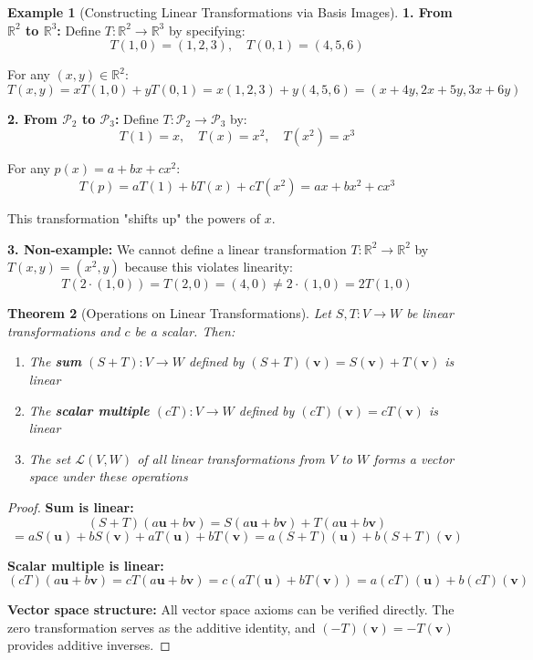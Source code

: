 \documentclass[12pt]{article}
\numberwithin{equation}{section}
\newcommand{\vect}[1]{\boldsymbol{#1}}   %
\theoremstyle{plain}
\newtheorem{theorem}{Theorem}[section]
\theoremstyle{definition}
\newtheorem{example}[theorem]{Example}
\theoremstyle{remark}
\begin{document}
\begin{example}[Constructing Linear Transformations via Basis Images]
\textbf{1. From $\mathbb{R}^2$ to $\mathbb{R}^3$:}
Define $T: \mathbb{R}^2 \to \mathbb{R}^3$ by specifying:
$$T(1, 0) = (1, 2, 3), \quad T(0, 1) = (4, 5, 6)$$

For any $(x, y) \in \mathbb{R}^2$:
$$T(x, y) = xT(1, 0) + yT(0, 1) = x(1, 2, 3) + y(4, 5, 6) = (x + 4y, 2x + 5y, 3x + 6y)$$

\textbf{2. From $\mathcal{P}_2$ to $\mathcal{P}_3$:}
Define $T: \mathcal{P}_2 \to \mathcal{P}_3$ by:
$$T(1) = x, \quad T(x) = x^2, \quad T(x^2) = x^3$$

For any $p(x) = a + bx + cx^2$:
$$T(p) = aT(1) + bT(x) + cT(x^2) = ax + bx^2 + cx^3$$

This transformation "shifts up" the powers of $x$.

\textbf{3. Non-example:}
We cannot define a linear transformation $T: \mathbb{R}^2 \to \mathbb{R}^2$ by $T(x, y) = (x^2, y)$ because this violates linearity:
$$T(2 \cdot (1, 0)) = T(2, 0) = (4, 0) \neq 2 \cdot (1, 0) = 2T(1, 0)$$
\end{example}

\begin{theorem}[Operations on Linear Transformations]
Let $S, T: V \to W$ be linear transformations and $c$ be a scalar. Then:
\begin{enumerate}
\item The \textbf{sum} $(S + T): V \to W$ defined by $(S + T)(\vect{v}) = S(\vect{v}) + T(\vect{v})$ is linear
\item The \textbf{scalar multiple} $(cT): V \to W$ defined by $(cT)(\vect{v}) = cT(\vect{v})$ is linear
\item The set $\mathcal{L}(V, W)$ of all linear transformations from $V$ to $W$ forms a vector space under these operations
\end{enumerate}
\end{theorem}

\begin{proof}
\textbf{Sum is linear:}
$$(S + T)(a\vect{u} + b\vect{v}) = S(a\vect{u} + b\vect{v}) + T(a\vect{u} + b\vect{v})$$
$$= aS(\vect{u}) + bS(\vect{v}) + aT(\vect{u}) + bT(\vect{v}) = a(S + T)(\vect{u}) + b(S + T)(\vect{v})$$

\textbf{Scalar multiple is linear:}
$$(cT)(a\vect{u} + b\vect{v}) = cT(a\vect{u} + b\vect{v}) = c(aT(\vect{u}) + bT(\vect{v})) = a(cT)(\vect{u}) + b(cT)(\vect{v})$$

\textbf{Vector space structure:} All vector space axioms can be verified directly. The zero transformation serves as the additive identity, and $(-T)(\vect{v}) = -T(\vect{v})$ provides additive inverses.
\end{proof}
\end{document}
